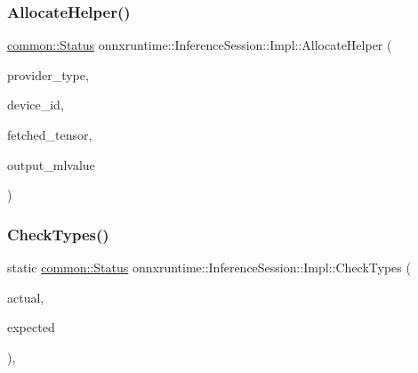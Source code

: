 \subsubsection{\texorpdfstring{Allocate\+Helper()}{AllocateHelper()}}
{\footnotesize\ttfamily \mbox{\hyperlink{classonnxruntime_1_1common_1_1Status}{common\+::\+Status}} onnxruntime\+::\+Inference\+Session\+::\+Impl\+::\+Allocate\+Helper (\begin{DoxyParamCaption}\item[{\mbox{\hyperlink{namespaceonnxruntime_a863e2227cbf32aab76aad35fdadff4bb}{onnxruntime\+::\+Provider\+Type}}}]{provider\+\_\+type,  }\item[{int}]{device\+\_\+id,  }\item[{const \mbox{\hyperlink{classonnxruntime_1_1Tensor}{Tensor}} \&}]{fetched\+\_\+tensor,  }\item[{\mbox{\hyperlink{classonnxruntime_1_1MLValue}{M\+L\+Value}} \&}]{output\+\_\+mlvalue }\end{DoxyParamCaption})\hspace{0.3cm}{\ttfamily [inline]}}

\mbox{\label{classonnxruntime_1_1InferenceSession_1_1Impl_a1ac8cdb4798aecb427ccfaf41511d8f6}} 
\subsubsection{\texorpdfstring{Check\+Types()}{CheckTypes()}}
{\footnotesize\ttfamily static \mbox{\hyperlink{classonnxruntime_1_1common_1_1Status}{common\+::\+Status}} onnxruntime\+::\+Inference\+Session\+::\+Impl\+::\+Check\+Types (\begin{DoxyParamCaption}\item[{\mbox{\hyperlink{namespaceonnxruntime_ad77d0a6e838ec7da5dc35fed5ee66b49}{M\+L\+Data\+Type}}}]{actual,  }\item[{\mbox{\hyperlink{namespaceonnxruntime_ad77d0a6e838ec7da5dc35fed5ee66b49}{M\+L\+Data\+Type}}}]{expected }\end{DoxyParamCaption})\hspace{0.3cm}{\ttfamily [inline]}, {\ttfamily [static]}}

\mbox{\label{classonnxruntime_1_1InferenceSession_1_1Impl_ac681c08b076eb5cc3a97424b147e6a92}} 
